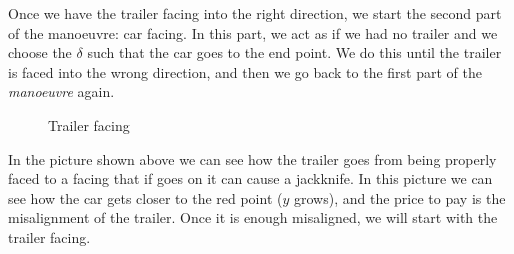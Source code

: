 Once we have the trailer facing into the right direction, we start the second part of the manoeuvre: car facing. In this part, we act as if we had no trailer and we choose the $\delta$ such that the car goes to the end point. We do this until the trailer is faced into the wrong direction, and then we go back to the first part of the \textit{manoeuvre} again.\\

\begin{figure}[H] 
    \centering
    \caption{Trailer facing}
\end{figure}

In the picture shown above we can see how the trailer goes from being properly faced to a facing that if goes on it can cause a jackknife. In this picture we can see how the car gets closer to the red point ($y$ grows), and the price to pay is the misalignment of the trailer. Once it is enough misaligned, we will start with the trailer facing.\\

